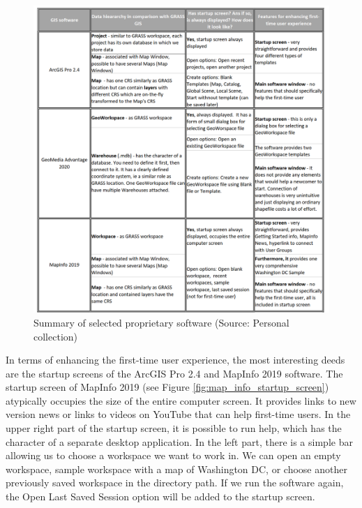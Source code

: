 \documentclass[a4paper,10pt,twoside]{article}
\begin{document}
\vspace{0.3cm}
\begin{figure}[hbt!] 
\begin{center}
\includegraphics[width=16.5cm]{../pictures/proprietary_software.png}
\caption[Summary of selected proprietary software]{Summary of selected proprietary software (Source: Personal collection)}
\label{fig:proprietary_software}
\end{center}
\end{figure}

\noindent In terms of enhancing the first-time user experience, the
most interesting deeds are the startup screens of the ArcGIS Pro 2.4
and MapInfo 2019 software. The startup screen of MapInfo 2019 (see
Figure \ref{fig:map_info_startup_screen}) atypically occupies the size
of the entire computer screen. It provides links to new version news
or links to videos on YouTube that can help first-time users. In the
upper right part of the startup screen, it is possible to run help,
which has the character of a separate desktop application. In the left
part, there is a simple bar allowing us to choose a workspace we want
to work in. We can open an empty workspace, sample workspace with a
map of Washington DC, or choose another previously saved workspace in
the directory path. If we run the software again, the Open Last Saved
Session option will be added to the startup screen.
\end{document}
